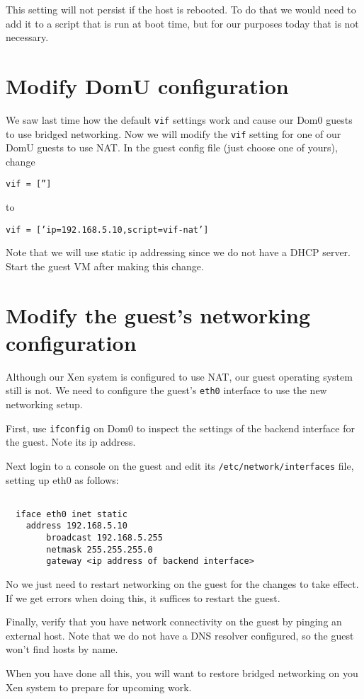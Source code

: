\documentclass{article}
\begin{document}
This setting will not persist if the host is rebooted. To do that we would need to add it to a script that is run at boot time, 
but for our purposes today that is not necessary.

\section{Modify DomU configuration}
We saw last time how the default \texttt{vif} settings work and cause our Dom0 guests to use bridged networking. 
Now we will modify the \texttt{vif} setting for one of our DomU guests to use NAT. In the guest config file (just choose one of yours), change 

\texttt{vif = ['']}

to 

\texttt{vif = ['ip=192.168.5.10,script=vif-nat']}

Note that we will use static ip addressing since we do not have a DHCP server. Start the guest VM after making this change.

\section{Modify the guest's networking configuration}
Although our Xen system is configured to use NAT, our guest operating system still is not. We need to configure 
the guest's \texttt{eth0} interface to use the new networking setup.

First, use \texttt{ifconfig} on Dom0 to inspect the settings of the backend interface for the guest. Note its ip address.

Next login to a console on the guest and edit its \texttt{/etc/network/interfaces} file, setting up eth0 as follows:

\begin{verbatim}

  iface eth0 inet static
    address 192.168.5.10
        broadcast 192.168.5.255
        netmask 255.255.255.0
        gateway <ip address of backend interface>
 \end{verbatim}
 
 No we just need to restart networking on the guest for the changes to take effect. If we get errors when doing this, it suffices to restart the guest. 
 
 Finally, verify that you have network connectivity on the guest by pinging an external host. Note that we do not have a 
 DNS resolver configured, so the guest won't find hosts by name.
 
 When you have done all this, you will want to restore bridged networking on you Xen system to prepare for upcoming 
 work.
\end{document}
